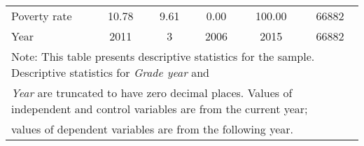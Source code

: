 \begin{table}[htbp]
\begin{tabular}{l*{1}{ccccc}}
\hspace{0.25cm} Poverty rate&       10.78&        9.61&        0.00&      100.00&       66882\\
\hspace{0.25cm} Year&        2011&           3&        2006&        2015&       66882\\
\bottomrule
\multicolumn{6}{l}{\footnotesize Note: This table presents descriptive statistics for the sample. Descriptive statistics for \emph{Grade year} and}\\
\multicolumn{6}{l}{\footnotesize \emph{Year} are truncated to have zero decimal places. Values of independent and control variables are from the current year;}\\
\multicolumn{6}{l}{\footnotesize values of dependent variables are from the following year.}\\
\end{tabular}
\end{table}
